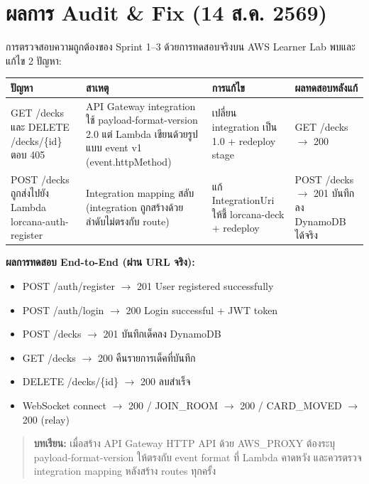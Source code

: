 \documentclass[12pt,a4paper]{article}
\begin{document}
\section{ผลการ Audit \& Fix (14 ส.ค. 2569)}

การตรวจสอบความถูกต้องของ Sprint 1--3 ด้วยการทดสอบจริงบน AWS Learner Lab พบและแก้ไข 2 ปัญหา:

\begin{table}[h!]
\centering
\small
\begin{tabular}{p{3.5cm} p{4.5cm} p{3.5cm} p{3cm}}
\toprule
\textbf{ปัญหา} & \textbf{สาเหตุ} & \textbf{การแก้ไข} & \textbf{ผลทดสอบหลังแก้} \\
\midrule
GET /decks และ DELETE /decks/\{id\} ตอบ 405 & API Gateway integration ใช้ payload-format-version 2.0 แต่ Lambda เขียนด้วยรูปแบบ event v1 (event.httpMethod) & เปลี่ยน integration เป็น 1.0 + redeploy stage & GET /decks $\rightarrow$ 200 \\
POST /decks ถูกส่งไปยัง Lambda lorcana-auth-register & Integration mapping สลับ (integration ถูกสร้างด้วยลำดับไม่ตรงกับ route) & แก้ IntegrationUri ให้ชี้ lorcana-deck + redeploy & POST /decks $\rightarrow$ 201 บันทึกลง DynamoDB ได้จริง \\
\bottomrule
\end{tabular}
\end{table}

\textbf{ผลการทดสอบ End-to-End (ผ่าน URL จริง):}
\begin{itemize}[leftmargin=1.5em, itemsep=2pt]
  \item POST /auth/register $\rightarrow$ 201 User registered successfully
  \item POST /auth/login $\rightarrow$ 200 Login successful + JWT token
  \item POST /decks $\rightarrow$ 201 บันทึกเด็คลง DynamoDB
  \item GET /decks $\rightarrow$ 200 คืนรายการเด็คที่บันทึก
  \item DELETE /decks/\{id\} $\rightarrow$ 200 ลบสำเร็จ
  \item WebSocket connect $\rightarrow$ 200 / JOIN\_ROOM $\rightarrow$ 200 / CARD\_MOVED $\rightarrow$ 200 (relay)
\end{itemize}

\begin{quote}
\textbf{บทเรียน:} เมื่อสร้าง API Gateway HTTP API ด้วย AWS\_PROXY ต้องระบุ payload-format-version ให้ตรงกับ event format ที่ Lambda คาดหวัง และควรตรวจ integration mapping หลังสร้าง routes ทุกครั้ง
\end{quote}
\end{document}
